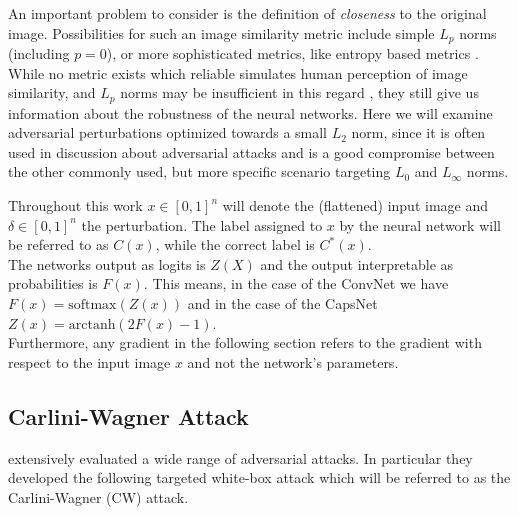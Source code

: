 An important problem to consider is the definition of \emph{closeness} to the original image. Possibilities for such an image similarity metric include simple $L_p$ norms (including $p=0$),
or more sophisticated metrics, like entropy based metrics \citep{umbrella}.
While no metric exists which reliable simulates human perception of image similarity, and $L_p$ norms may be insufficient in this regard \citep{lpnorms}, they still give us information about the robustness of the neural networks.
Here we will examine adversarial perturbations optimized towards a small $L_2$ norm, since it is often used in discussion about adversarial attacks and is a good compromise between the other commonly used, but more specific scenario targeting $L_0$ and $L_\infty$ norms.

Throughout this work $x \in [0,1]^n$ will denote the (flattened) input image and $\delta \in [0,1]^n$ the perturbation.
The label assigned to $x$ by the neural network will be referred to as $C(x)$, while the correct label is $C^*(x)$.\\
The networks output as logits is $Z(X)$ and the output interpretable as probabilities is $F(x)$.
This means, in the case of the ConvNet we have $F(x) = \mathrm{softmax}(Z(x))$ and in the case of the CapsNet $Z(x) = \mathrm{arctanh}(2F(x) - 1)$. \\
Furthermore, any gradient in the following section refers to the gradient with respect to the input image $x$ and not the network's parameters.

\subsection{Carlini-Wagner Attack}

\citet{carlini} extensively evaluated a wide range of adversarial attacks.
In particular they developed the following targeted white-box attack which will be referred to as the Carlini-Wagner (CW) attack.

